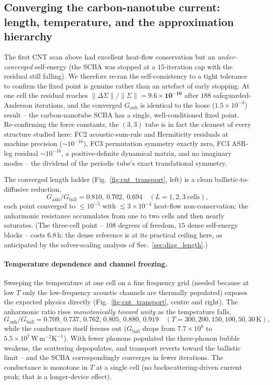 \subsection{Converging the carbon-nanotube current: length, temperature, and the approximation
hierarchy}
\label{sec:diag_cnt_converged}

The first CNT scan above had excellent heat-flow conservation but an \emph{under-converged} self-energy
(the SCBA was stopped at a $15$-iteration cap with the residual still falling). We therefore re-ran the
self-consistency to a tight tolerance to confirm the fixed point is genuine rather than an artefact of
early stopping. At one cell the residual reaches $\|\Delta\Sigma\|/\|\Sigma\|=\mathbf{9.6\times10^{-10}}$
after $188$ safeguarded-Anderson iterations, and the converged $G_\mathrm{anh}$ is identical to the
loose ($1.5\times10^{-3}$) result -- the carbon-nanotube SCBA has a single, well-conditioned fixed
point. Re-confirming the force constants, the $(3,3)$ tube is in fact the cleanest of every structure
studied here: FC2 acoustic-sum-rule and Hermiticity residuals at machine precision
($\sim\!10^{-16}$), FC3 permutation symmetry exactly zero, FC3 ASR-leg residual $\sim\!10^{-16}$, a
positive-definite dynamical matrix, and no imaginary modes -- the dividend of the periodic tube's exact
translational symmetry.

The converged length ladder (Fig.~\ref{fig:cnt_transport}, left) is a clean ballistic-to-diffusive
reduction,
\[
  G_\mathrm{anh}/G_\mathrm{ball} = 0.810,\ 0.702,\ 0.694 \quad (L=1,2,3\ \text{cells}),
\]
each point converged to $\le\!10^{-5}$ with $\lesssim\!3\times10^{-4}$ heat-flow non-conservation; the
anharmonic resistance accumulates from one to two cells and then nearly saturates. (The three-cell
point -- $108$ degrees of freedom, $15$ dense self-energy blocks -- costs $6.8$\,h: the dense reference
is at its practical ceiling here, as anticipated by the solver-scaling analysis of
Sec.~\ref{sec:diag_length}.)

\paragraph{Temperature dependence and channel freezing.} Sweeping the temperature at one cell on a
fine frequency grid (needed because at low $T$ only the low-frequency acoustic channels are thermally
populated) exposes the expected physics directly (Fig.~\ref{fig:cnt_transport}, centre and right). The
anharmonic ratio rises \emph{monotonically toward unity} as the temperature falls,
\[
  G_\mathrm{anh}/G_\mathrm{ball} = 0.709,\,0.737,\,0.762,\,0.805,\,0.880,\,0.919
  \quad (T = 300,200,150,100,50,30\,\mathrm{K}),
\]
while the conductance itself freezes out ($G_\mathrm{ball}$ drops from $7.7\times10^{8}$ to
$5.5\times10^{7}\,\mathrm{W\,m^{-2}K^{-1}}$). With fewer phonons populated the three-phonon bubble
weakens, the scattering depopulates, and transport reverts toward the ballistic limit -- and the SCBA
correspondingly converges in fewer iterations. The conductance is monotone in $T$ at a single cell (no
backscattering-driven current peak; that is a longer-device effect).

